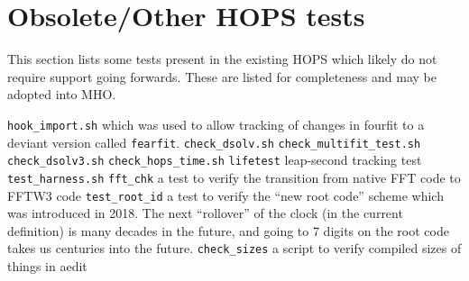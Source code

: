 %
%
\section{Obsolete/Other HOPS tests}
\label{sec:obsolete}

This section lists some tests present in the existing HOPS which likely
do not require support going forwards.  These are listed for completeness
and may be adopted into \ac{MHO}.
\begin{description}
 \texttt{hook\_import.sh} which was used to allow tracking of
    changes in \ac{fourfit} to a deviant version called \texttt{fearfit}.
 \texttt{check\_dsolv.sh}
 \texttt{check\_multifit\_test.sh}
 \texttt{check\_dsolv3.sh}
 \texttt{check\_hops\_time.sh}
 \texttt{lifetest} leap-second tracking test
 \texttt{test\_harness.sh}
 \texttt{fft\_chk} a test to verify the transition from native
    \ac{FFT} code to \ac{FFTW3} code
 \texttt{test\_root\_id} a test to verify the ``new root code''
    scheme which was introduced in 2018.  The next ``rollover'' of the
    clock (in the current definition) is many decades in the future,
    and going to 7 digits on the root code takes us centuries into the
    future.
 \texttt{check\_sizes} a script to verify compiled sizes of
    things in \ac{aedit}
\end{description}

%
%
